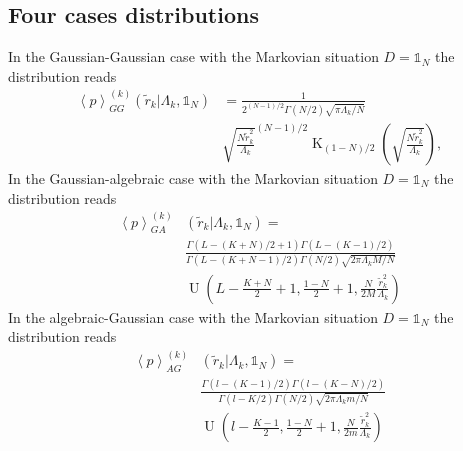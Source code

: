 \subsection{Four cases distributions}\label{subsec:distributions}

In the Gaussian-Gaussian case with the Markovian situation $D = \mathbb{1}_{N}$
the distribution reads
\begin{equation}
    \begin{split}
    \left\langle p \right\rangle_{GG}^{\left(k\right)}
    \left(\tilde{r}_{k} \vert \Lambda_{k}, \mathbb{1}_{N}\right) &=
    \frac{1}{2^{\left(N - 1\right) / 2} \Gamma \left(N / 2\right)
    \sqrt{\pi \Lambda_{k} / N}} \\
    & \sqrt{\frac{N \tilde{r}_{k}^2}{\Lambda_{k}}}^{\left(N - 1\right) / 2}
    \operatorname{K}_{\left(1 - N\right)/2}
    \left( \sqrt{\frac{N \tilde{r}^2_{k}}{\Lambda_{k}}}\right),
    \end{split}
\end{equation}
In the Gaussian-algebraic case with the Markovian situation
$D = \mathbb{1}_{N}$ the distribution reads
\begin{equation}
    \begin{split}
    \left\langle p \right\rangle_{GA}^{\left(k\right)} &
    \left(\tilde{r}_{k} \vert \Lambda_{k}, \mathbb{1}_{N}\right) = \\
    &\frac{\Gamma\left(L - \left(K + N \right) / 2 + 1\right)
    \Gamma\left(L - \left(K - 1\right) / 2\right)}
    {\Gamma\left(L - \left(K + N - 1\right) / 2\right) \Gamma\left(N / 2\right)
    \sqrt{2\pi \Lambda_{k}M/N}} \\
    & \operatorname{U} \left(L - \frac{K + N}{2} + 1, \frac{1 - N}{2} + 1,
    \frac{N}{2M} \frac{\tilde{r}^{2}_{k}}{\Lambda_{k}}\right)
    \end{split}
\end{equation}
In the algebraic-Gaussian case with the Markovian situation
$D = \mathbb{1}_{N}$ the distribution reads
\begin{equation}
    \begin{split}
    \left\langle p \right\rangle_{AG}^{\left(k\right)} &
    \left(\tilde{r}_{k} \vert \Lambda_{k}, \mathbb{1}_{N}\right) = \\
    &\frac{\Gamma\left(l - \left(K - 1 \right) / 2\right)
    \Gamma\left(l - \left(K - N\right) / 2\right)}
    {\Gamma\left(l - K / 2\right) \Gamma\left(N / 2\right)
    \sqrt{2\pi \Lambda_{k}m/N}} \\
    & \operatorname{U} \left(l - \frac{K - 1}{2}, \frac{1 - N}{2} + 1,
    \frac{N}{2m} \frac{\tilde{r}^{2}_{k}}{\Lambda_{k}}\right)
    \end{split}
\end{equation}
